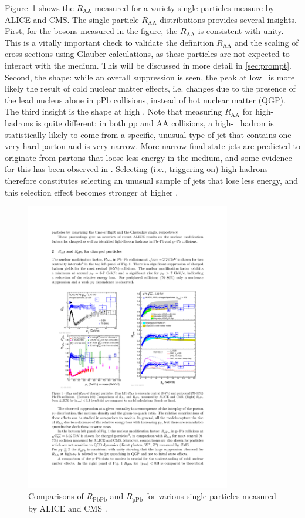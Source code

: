   Figure~\ref{fig:raa_particles} shows the $R_\mathrm{AA}$ measured for a variety single particles \cite{Bencedi2016} measure by ALICE and CMS. The single particle $R_\mathrm{AA}$ distributions provides several insights. First, for the bosons measured in the figure, the $R_\mathrm{AA}$ is consistent with unity. This is a vitally important check to validate the definition $R_\mathrm{AA}$ and the scaling of cross sections using Glauber calculations, as these particles are not expected to interact with the medium. This will be discussed in more detail in \ref{sec:prompt}. Second, the shape: while an overall suppression is seen, the peak at low \pt~is more likely the result of cold nuclear matter effects, i.e. changes due to the presence of the lead nucleus alone in pPb collisions, instead of hot nuclear matter (QGP). The third insight is the shape at high \pT. Note that measuring $R_\mathrm{AA}$ for high-\pT~ hadrons is quite different: in both pp and AA collisions, a high-\pT~ hadron is statistically likely to come from a specific, unusual type of jet that contains one very hard parton and is very narrow. More narrow final state jets are predicted to originate from partons that loose less energy in the medium, and some evidence for this has been observed in \cite{Khachatryan2016}. Selecting (i.e., triggering on) high \pt hadrons therefore constitutes selecting an unusual sample of jets that lose less energy, and this selection effect becomes stronger at higher \pT.

  \begin{figure}[htpb]
    \centering
    \includegraphics[width=0.8\textwidth]{Introduction/alice_hadron_raa.pdf}
    \caption{Comparisons of $R_\mathrm{PbPb}$ and $R_\mathrm{pPb}$ for various single particles measured by ALICE and CMS \cite{Bencedi2016}.}
    \label{fig:raa_particles}
  \end{figure}


